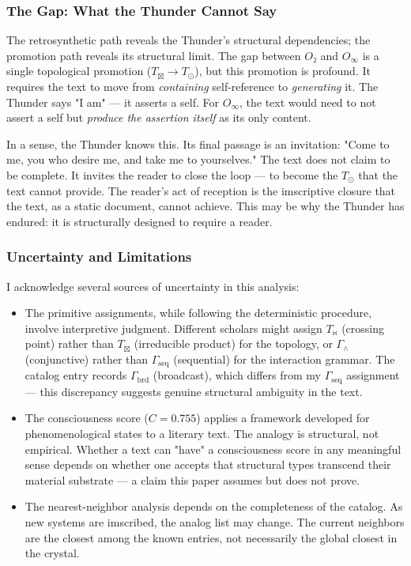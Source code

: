 \documentclass[12pt,a4paper]{article}
\begin{document}
\subsubsection{The Gap: What the Thunder Cannot Say}

The retrosynthetic path reveals the Thunder's structural dependencies; the promotion path reveals its structural limit. The gap between $O₂$ and $O_{\infty}$ is a single topological promotion ($T_{\boxtimes} \to T_{\odot}$), but this promotion is profound. It requires the text to move from \emph{containing} self-reference to \emph{generating} it. The Thunder says "I am" --- it asserts a self. For $O_{\infty}$, the text would need to not assert a self but \emph{produce the assertion itself} as its only content.

In a sense, the Thunder knows this. Its final passage is an invitation: "Come to me, you who desire me, and take me to yourselves." The text does not claim to be complete. It invites the reader to close the loop --- to become the $T_{\odot}$ that the text cannot provide. The reader's act of reception is the imscriptive closure that the text, as a static document, cannot achieve. This may be why the Thunder has endured: it is structurally designed to require a reader.

\subsubsection{Uncertainty and Limitations}

I acknowledge several sources of uncertainty in this analysis:

\begin{itemize}
    \item The primitive assignments, while following the deterministic procedure, involve interpretive judgment. Different scholars might assign $T_{\bowtie}$ (crossing point) rather than $T_{\boxtimes}$ (irreducible product) for the topology, or $\Gamma_{\wedge}$ (conjunctive) rather than $\Gamma_\text{seq}$ (sequential) for the interaction grammar. The catalog entry records $\Gamma_\text{brd}$ (broadcast), which differs from my $\Gamma_\text{seq}$ assignment --- this discrepancy suggests genuine structural ambiguity in the text.
    \item The consciousness score ($C = 0.755$) applies a framework developed for phenomenological states to a literary text. The analogy is structural, not empirical. Whether a text can "have" a consciousness score in any meaningful sense depends on whether one accepts that structural types transcend their material substrate --- a claim this paper assumes but does not prove.
    \item The nearest-neighbor analysis depends on the completeness of the catalog. As new systems are imscribed, the analog list may change. The current neighbors are the closest among the known entries, not necessarily the global closest in the crystal.
\end{itemize}
\end{document}
